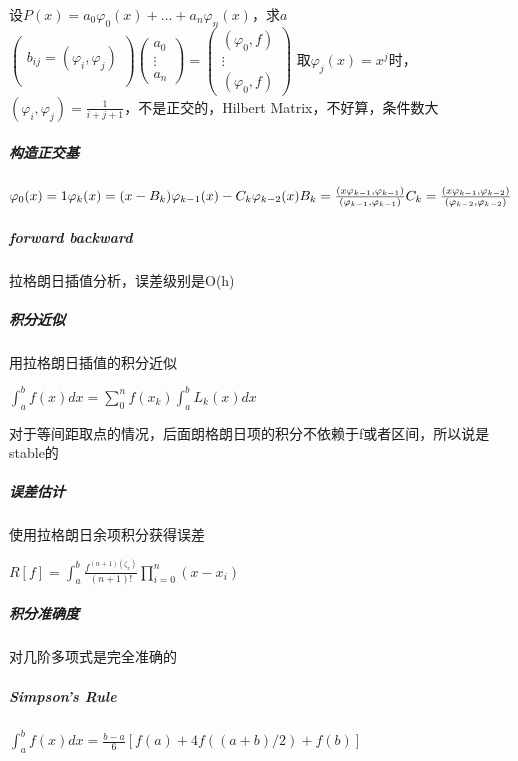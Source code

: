\documentclass[]{article}
\let\oldsubparagraph\subparagraph
\renewcommand{\subparagraph}[1]{\oldsubparagraph{#1}\mbox{}}
\begin{document}
\begin{multicols}{3}
设\(P(x)=a_0\varphi_0(x)+\ldots+a_n\varphi_n(x)\)，求\(a\)
$
\begin{pmatrix}
 \\
b_{ij}=(\varphi_i, \varphi_j)\\
\\
\end{pmatrix}
\begin{pmatrix}
a_0\\ \vdots \\ a_n
\end{pmatrix}
=
\begin{pmatrix}
(\varphi_0, f)\\ \vdots \\ (\varphi_0, f)
\end{pmatrix}
$
取\(\varphi_j(x)=x^j\)时，\((\varphi_i, \varphi_j)=\frac{1}{i+j+1}\)，不是正交的，Hilbert
Matrix，不好算，条件数大

\subparagraph{构造正交基}\label{header-c434}

\(\varphi_0(x) = 1 \\
\varphi_k(x) = (x-B_k)\varphi_{k-1}(x)-C_k\varphi_{k-2}(x)\\
B_k=\frac{(x\varphi_{k-1}, \varphi_{k-1})}{(\varphi_{k-1}, \varphi_{k-1})}\\
C_k=\frac{(x\varphi_{k-1}, \varphi_{k-2})}{(\varphi_{k-2}, \varphi_{k-2})}\\\)


\subparagraph{forward backward}\label{header-c437}

拉格朗日插值分析，误差级别是O(h)

\subparagraph{积分近似}\label{header-c440}

用拉格朗日插值的积分近似

\(\int_a^bf(x)dx = \sum_0^nf(x_k)\int_a^bL_k(x)dx\)

对于等间距取点的情况，后面朗格朗日项的积分不依赖于f或者区间，所以说是stable的

\subparagraph{误差估计}\label{header-c446}

使用拉格朗日余项积分获得误差

\(R[f] = \int_a^b\frac{f^{(n+1)(\zeta_x)}}{(n+1)!}\prod_{i=0}^n(x - x_i)\)

\subparagraph{积分准确度}\label{header-c450}

对几阶多项式是完全准确的

\subparagraph{Simpson's Rule}\label{header-c455}

\(\int_a^bf(x)dx = \frac{b-a}{6}[f(a) + 4f((a+b)/2)+f(b)]\)



\end{multicols}
\end{document}
